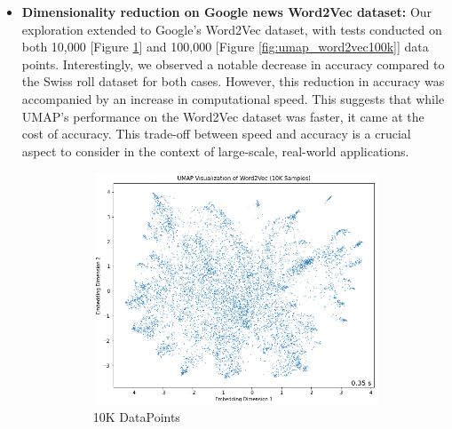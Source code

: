 \begin{itemize}
\begin{itemize}
            \item \textbf{Dimensionality reduction on Google news Word2Vec dataset:}
            Our exploration extended to Google’s Word2Vec dataset, with tests conducted on both 10,000 [Figure \ref{fig:umap_word2vec10k}] and 100,000 [Figure \ref{fig:umap_word2vec100k}] data points. Interestingly, we observed a notable decrease in accuracy compared to the Swiss roll dataset for both cases. However, this reduction in accuracy was accompanied by an increase in computational speed. This suggests that while UMAP’s performance on the Word2Vec dataset was faster, it came at the cost of accuracy. This trade-off between speed and accuracy is a crucial aspect to consider in the context of large-scale, real-world applications.

            \begin{figure}[H]
                \begin{subfigure}{0.5\textwidth}
                    \centering
                    \captionsetup{justification=centering}
                    \includegraphics[width=\textwidth]{images/umap_word2vec10k.png}
                    \caption{10K DataPoints}
                    \label{fig:umap_word2vec10k}
                \end{subfigure}
                \begin{subfigure}{0.5\textwidth}
                    \centering
                    \captionsetup{justification=centering}

\end{subfigure}
\end{figure}
\end{itemize}
\end{itemize}
